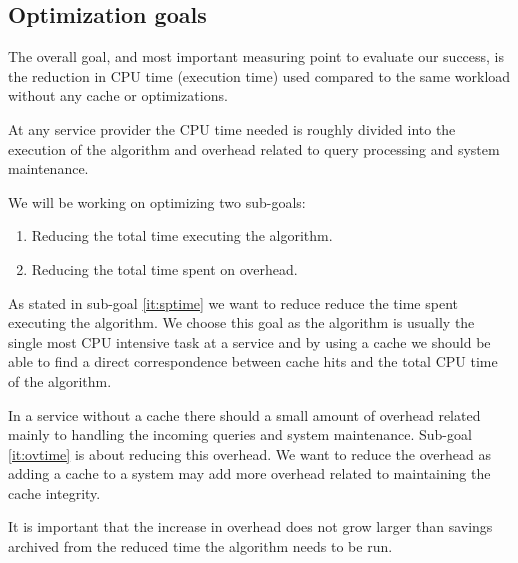  


\subsection{Optimization goals}\label{subsec:goals}

The overall goal, and most important measuring point to evaluate our success, is the reduction in CPU time (execution time) used compared to the same workload without any cache or optimizations.

At any \spath service provider the CPU time needed is roughly divided into the execution of the \spath algorithm and overhead related to query processing and system maintenance. 

We will be working on optimizing two sub-goals:
\begin{enumerate}
\item \label{it:sptime} Reducing the total time executing the \spath algorithm.
\item \label{it:ovtime} Reducing the total time spent on overhead.
\end{enumerate}


As stated in sub-goal \ref{it:sptime} we want to reduce reduce the time spent executing the \spath algorithm. We choose this goal as the \spath algorithm is usually the single most CPU intensive task at a \spath service \cite{ref.} and by using a cache we should be able to find a direct correspondence between cache hits and the total CPU time of the \spath algorithm.

In a \spath service without a cache there should a small amount of overhead related mainly to handling the incoming queries and system maintenance. Sub-goal \ref{it:ovtime} is about reducing this overhead. We want to reduce the overhead as adding a cache to a \spath system may add more overhead related to maintaining the cache integrity.

It is important that the increase in overhead does not grow larger than savings archived from the reduced time the \spath algorithm needs to be run.



